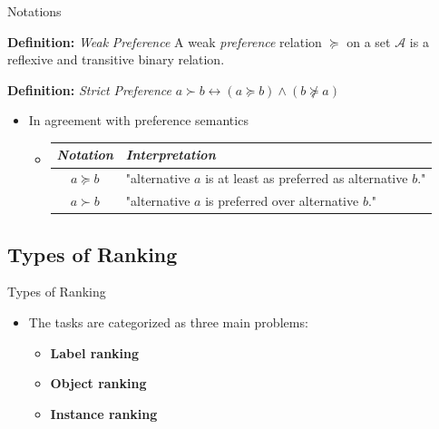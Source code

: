 \documentclass[8pt]{beamer}
\newcommand{\Ytri}{$\triangleright$ }
\renewcommand{\|}[1][.3em]{\hspace{#1}|\hspace{#1}}
\renewcommand{\,}[1][.3em]{,\hspace{#1}}
\newlength{\wideitemsep}
\let\olditem\item
\renewcommand{\item}{\setlength{\itemsep}{\wideitemsep}\olditem}
\newcommand{\subitem}{\item[\Ytri]}
\newcommand{\Cp}{\emph{Preference} }
\newcommand{\p}{\emph{preference} }
\renewcommand{\,}{,\hspace{3pt}}
\renewcommand{\|}{\hspace{3pt}|\hspace{3pt}}
\begin{document}
\begin{frame}{Notations}
	\begin{block}{\textbf{Definition:} \textit{Weak} \Cp}
	A weak \p relation  $\succeq$ on a set $\mathcal{A}$ is a reflexive and transitive binary relation.
	\end{block}
	\begin{block}{\textbf{Definition:} \textit{Strict} \Cp}\center
	$a \succ b  \longleftrightarrow  (a \succeq b) \wedge (b \nsucceq a)$
	\end{block}
    \begin{itemize}
    \item In agreement with preference semantics
        \begin{itemize}
        \item[] \vspace{1em}
            \begin{table}
	            \centering
	            \begin{tabular}{c|l}
	                \textit{Notation} & \textit{Interpretation} \\\hline\rule{0pt}{1.6em}
	                $a \succeq b$ & "alternative $a$ is at least as preferred as alternative $b$." \\\rule{0pt}{1.6em}
	                $a \succ b$ & "alternative $a$ is preferred over alternative $b$."\\
	            \end{tabular}
	        \end{table}
        \end{itemize}
    \end{itemize}
\end{frame}

\subsection{Types of Ranking}

\begin{frame}{Types of Ranking}
    \begin{itemize}
    \setlength\itemsep{1em}
    \item The tasks are categorized as three main problems:\\
        \begin{itemize}
        \subitem \textbf{Label ranking}
        \subitem \textbf{Object ranking}
        \subitem \textbf{Instance ranking}
        \end{itemize}
    \end{itemize}
\end{frame}
\end{document}
